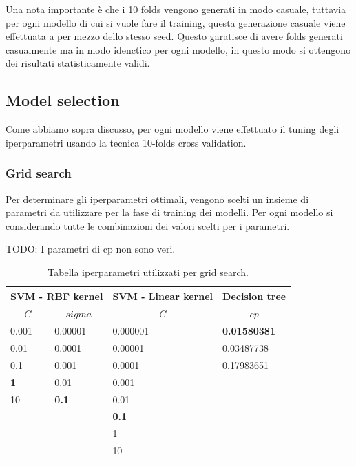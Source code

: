 Una nota importante è che i 10 folds vengono generati in modo casuale, tuttavia per ogni modello di cui si vuole fare il training, questa generazione casuale viene effettuata a per mezzo dello stesso seed. Questo garatisce di avere folds generati casualmente ma in modo idenctico per ogni modello, in questo modo si ottengono dei risultati statisticamente validi.

\subsection{Model selection}
\label{sec:mode_selection}
Come abbiamo sopra discusso, per ogni modello viene effettuato il tuning degli iperparametri usando la tecnica 10-folds cross validation.

\subsubsection{Grid search}
\label{sec:grid-search}
Per determinare gli iperparametri ottimali, vengono scelti un insieme di parametri da utilizzare per la fase di training dei modelli. Per ogni modello si considerando tutte le combinazioni dei valori scelti per i parametri.


TODO: I parametri di cp non sono veri.
\begin{table}[H]
	
	\begin{center}
		
		\begin{tabular}{| l | l | l | l |}
			\hline
			\multicolumn{2}{|c|}{\textbf{SVM -  RBF kernel}} &
			\multicolumn{1}{|c|}{\textbf{SVM - Linear kernel}} &
			\multicolumn{1}{c|}{\textbf{Decision tree}}\\
			\hline
			\hline
			\multicolumn{1}{|c}{$C$} &
			\multicolumn{1}{c|}{$sigma$} &
			\multicolumn{1}{c|}{$C$ } &
			\multicolumn{1}{c|}{$cp$}\\
			\hline
			0.001	 & 0.00001    & 0.000001 & \textbf{0.01580381}\\
			0.01	  & 0.0001      &0.00001	& 0.03487738\\
			0.1	   & 0.001      	&0.0001	   & 0.17983651\\
			\textbf{1}			& 0.01      	  &0.001		  & \\
			10	   &\textbf{ 0.1 }     	  &0.01		   & \\
			&       		   	     &\textbf{0.1}			   & \\
			&       	  			 &1				& \\
			&       	  			 &10			   & \\
				  		   
			\hline
		\end{tabular}
		
	\end{center}
	\caption{Tabella iperparametri utilizzati per grid search.}
\end{table}

